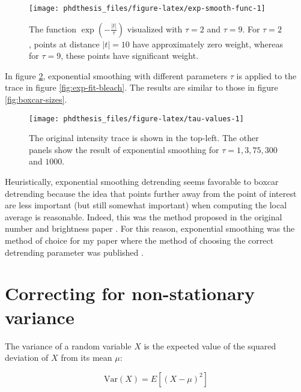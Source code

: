 \documentclass[12pt,]{book}
\theoremstyle{definition}
\theoremstyle{definition}
\theoremstyle{definition}
\theoremstyle{remark}
\let\BeginKnitrBlock\begin \let\EndKnitrBlock\end
\begin{document}
\begin{figure}

\texttt{[image: phdthesis\_files/figure-latex/exp-smooth-func-1]} \hfill{}

\caption{The function \(\exp(-\frac{|t|}{\tau})\)
visualized with \(\tau = 2\) and \(\tau = 9\). For \(\tau = 2\), points
at distance \(|t| = 10\) have approximately zero weight, whereas for
\(\tau = 9\), these points have significant weight.}\label{fig:exp-smooth-func}
\end{figure}

In figure \ref{fig:tau-values}, exponential smoothing with different
parameters \(\tau\) is applied to the trace in figure
\ref{fig:exp-fit-bleach}. The results are similar to those in figure
\ref{fig:boxcar-sizes}.





\begin{figure}

\texttt{[image: phdthesis\_files/figure-latex/tau-values-1]} \hfill{}

\caption{The original intensity trace is shown in the
top-left. The other panels show the result of exponential smoothing for
\(\tau = 1, 3, 75, 300\) and \(1000\).}\label{fig:tau-values}
\end{figure}

Heuristically, exponential smoothing detrending seems favorable to
boxcar detrending because the idea that points further away from the
point of interest are less important (but still somewhat important) when
computing the local average is reasonable. Indeed, this was the method
proposed in the original number and brightness paper \citep{NB}. For
this reason, exponential smoothing was the method of choice for my paper
where the method of choosing the correct detrending parameter was
published \citep{nandb}.

\section{Correcting for non-stationary
variance}\label{correcting-for-non-stationary-variance}

\BeginKnitrBlock{definition}
\protect\hypertarget{def:unnamed-chunk-34}{}{\label{def:unnamed-chunk-34}
}The variance of a random variable \(X\) is the expected value of the
squared deviation of \(X\) from its mean \(\mu\):

\begin{equation}
\text{Var}(X) = E[(X - \mu)^2]
\label{eq:variance}
\end{equation}
\EndKnitrBlock{definition}
\end{document}
